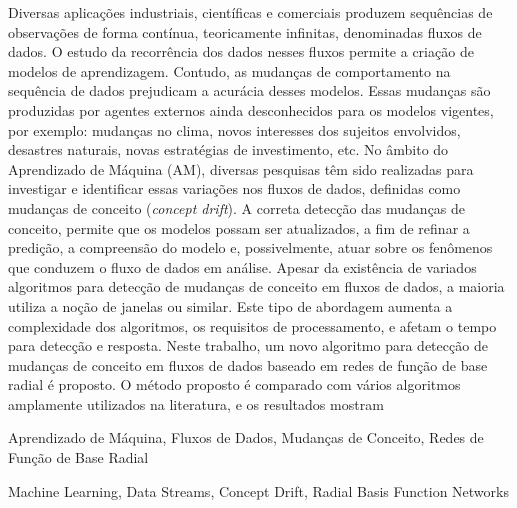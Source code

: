 \documentclass[qual, classic, a4paper]{ufbathesis}
\begin{document}
Diversas aplicações industriais, científicas e comerciais produzem sequências de observações de forma contínua, teoricamente infinitas, denominadas fluxos de dados. 
O estudo da recorrência dos dados nesses fluxos permite a criação de modelos de aprendizagem. Contudo, as mudanças de comportamento na sequência de dados prejudicam a acurácia desses modelos.
Essas mudanças são produzidas por agentes externos ainda desconhecidos para os modelos vigentes, por exemplo: mudanças no clima, novos interesses dos sujeitos envolvidos, desastres naturais, novas estratégias de investimento, etc.
No âmbito do Aprendizado de Máquina (AM), diversas pesquisas têm sido realizadas para investigar e identificar essas variações nos fluxos de dados, definidas como mudanças de conceito (\textit{concept drift}).
A correta detecção das mudanças de conceito, permite que os modelos possam ser atualizados, a fim de refinar a predição, a compreensão do modelo e, possivelmente, atuar sobre os fenômenos que conduzem o fluxo de dados em análise.
Apesar da existência de variados algoritmos para detecção de mudanças de conceito em fluxos de dados, a maioria utiliza a noção de janelas ou similar. Este tipo de abordagem aumenta a complexidade dos algoritmos, os requisitos de processamento, e afetam o tempo para detecção e resposta. 
Neste trabalho, um novo algoritmo para detecção de mudanças de conceito em fluxos de dados baseado em redes de função de base radial é proposto. O método proposto é comparado com vários algoritmos amplamente utilizados na literatura, e os resultados mostram 

\begin{keywords}
    Aprendizado de Máquina, Fluxos de Dados, Mudanças de Conceito, Redes de Função de Base Radial
\end{keywords}

\abstract


\begin{keywords}
    Machine Learning, Data Streams, Concept Drift, Radial Basis Function Networks
\end{keywords}


\tableofcontents

\listoffigures
\end{document}
